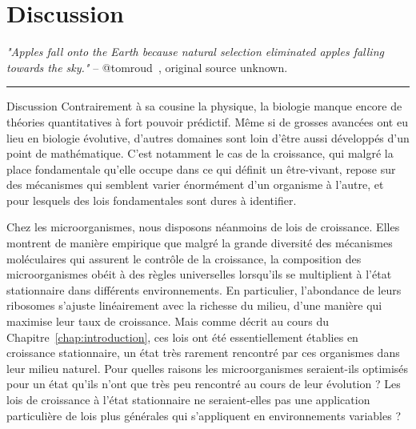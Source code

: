 \chapter{Discussion}
\label{chap:discussion}

\textit{"Apples fall onto the Earth because natural selection eliminated apples falling towards the sky."} -- @tomroud~\cite{tomroud_tom_2016}, original source unknown.


\begin{center}
\noindent\rule{4cm}{0.1pt}
\end{center}

\begin{chapter_summary}{Discussion}
Contrairement à sa cousine la physique, la biologie manque encore de théories quantitatives à fort pouvoir prédictif.
Même si de grosses avancées ont eu lieu en biologie évolutive, d'autres domaines sont loin d'être aussi développés d'un point de mathématique.
C'est notamment le cas de la croissance, qui malgré la place fondamentale qu'elle occupe dans ce qui définit un être-vivant, repose sur des mécanismes qui semblent varier énormément d'un organisme à l'autre, et pour lesquels des lois fondamentales sont dures à identifier.

Chez les microorganismes, nous disposons néanmoins de lois de croissance.
Elles montrent de manière empirique que malgré la grande diversité des mécanismes moléculaires qui assurent le contrôle de la croissance, la composition des microorganismes obéit à des règles universelles lorsqu'ils se multiplient à l'état stationnaire dans différents environnements.
En particulier, l'abondance de leurs ribosomes s'ajuste linéairement avec la richesse du milieu, d'une manière qui maximise leur taux de croissance.
Mais comme décrit au cours du Chapitre~\ref{chap:introduction}, ces lois ont été essentiellement établies en croissance stationnaire, un état très rarement rencontré par ces organismes dans leur milieu naturel.
Pour quelles raisons les microorganismes seraient-ils optimisés pour un état qu'ils n'ont que très peu rencontré au cours de leur évolution ?
Les lois de croissance à l'état stationnaire ne seraient-elles pas une application particulière de lois plus générales qui s'appliquent en environnements variables ?


\end{chapter_summary}
